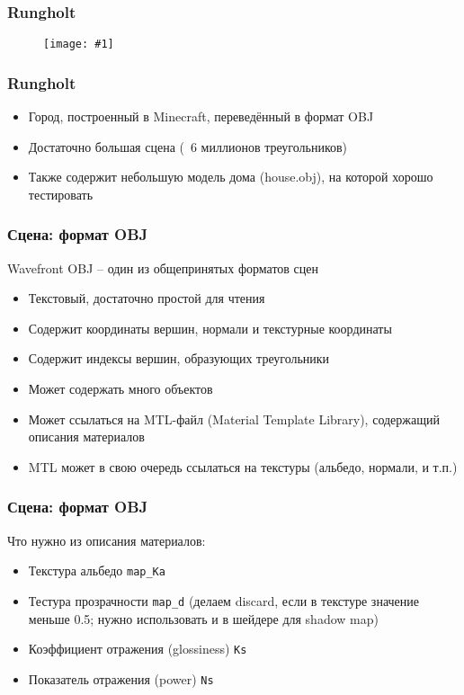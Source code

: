 \documentclass{beamer}
\newcommand{\slideimage}[1]{
  \begin{figure}
    \begin{adjustbox}{width=\textwidth, totalheight=\textheight-2\baselineskip-2\baselineskip,keepaspectratio}
      \texttt{[image: \#1]}
    \end{adjustbox}
  \end{figure}
}
\begin{document}
\begin{frame}[fragile]
\frametitle{Rungholt}
\slideimage{rungholt.png}
\end{frame}

\begin{frame}[fragile]
\frametitle{Rungholt}
\begin{itemize}
\item Город, построенный в Minecraft, переведённый в формат OBJ
\item Достаточно большая сцена (~6 миллионов треугольников)
\item Также содержит небольшую модель дома (house.obj), на которой хорошо тестировать
\end{itemize}
\end{frame}

\begin{frame}[fragile]
\frametitle{Сцена: формат OBJ}
Wavefront OBJ -- один из общепринятых форматов сцен
\begin{itemize}
\item Текстовый, достаточно простой для чтения
\item Содержит координаты вершин, нормали и текстурные координаты
\item Содержит индексы вершин, образующих треугольники
\item Может содержать много объектов
\item Может ссылаться на MTL-файл (Material Template Library), содержащий описания материалов
\item MTL может в свою очередь ссылаться на текстуры (альбедо, нормали, и т.п.)
\end{itemize}
\end{frame}

\begin{frame}[fragile]
\frametitle{Сцена: формат OBJ}
Что нужно из описания материалов:
\begin{itemize}
\item Текстура альбедо \verb|map_Ka|
\item Тестура прозрачности \verb|map_d| (делаем discard, если в текстуре значение меньше 0.5; нужно использовать и в шейдере для shadow map)
\item Коэффициент отражения (glossiness) \verb|Ks|
\item Показатель отражения (power) \verb|Ns|
\end{itemize}
\end{frame}
\end{document}
